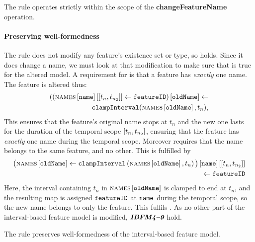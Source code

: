 \begin{lemma}
   The  rule operates strictly within the scope of the \textbf{changeFeatureName} operation.
   \label{lemma:change-feature-name-scope}
\end{lemma}

\paragraph{Preserving well-formedness}
The rule does not modify any feature's existence set or type, so  holds. Since it does change a name, we must look at that modification to make sure that  is true for the altered model. A requirement for  is that a feature has \emph{exactly} one name. 
The feature is altered thus:
\[
   \begin{split}
        (\lookup{\left(\lookup{\lookup{\names{}}{\var{name}}}{\interval{t_n}{t_{n_2}}} \assign \var{featureID}\right)}{\var{oldName}} \assign \\
        \var{clampInterval}(\lookup{\names}{\var{oldName}}, t_n), \\
   \end{split}
\]
This ensures that the feature's original name stops at $t_n$ and the new one lasts for the duration of the temporal scope $\interval{t_n}{t_{n_2}}$, ensuring that the feature has \emph{exactly} one name during the temporal scope.
Moreover  requires that the name belongs to the same feature, and no other. This is fulfilled by 
\[
   \begin{split}
        \lookup{\lookup{\big(\lookup{\names{}}{\var{oldName}} \assign 
        \var{clampInterval}\left(\lookup{\names}{\var{oldName}}, t_n\right) \big)}{\var{name}}}{\interval{t_n}{t_{n_2}}} \\
        \assign \var{featureID} \\
   \end{split}
\]
Here, the interval containing $t_n$ in $\textsc{names} \left[ \texttt{oldName} \right]$ is clamped to end at $t_n$, and the resulting map is assigned $\texttt{featureID}$ at $\texttt{name}$ during the temporal scope, so the new name belongs to only the feature. This fulfils .
As no other part of the interval-based feature model is modified, $\textit{\textbf{IBFM4\textendash 9}}$ hold.
\\

\begin{lemma}
   The  rule preserves well-formedness of the interval-based feature model. 
   \label{lemma:change-feature-name-well-formed}
\end{lemma}

